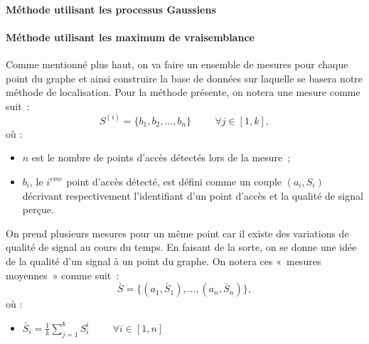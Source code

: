 \documentclass[10pt,journal,compsoc]{IEEEtran}
\begin{document}
	  \paragraph{Méthode utilisant les processus Gaussiens}

	  \paragraph{Méthode utilisant les maximum de vraisemblance}
        Comme mentionné plus haut, on va faire un ensemble de mesures pour chaque point du graphe et ainsi construire la base de données sur laquelle se basera notre
		méthode de localisation. Pour la méthode présente, on notera une mesure comme suit~:
        \begin{equation}
          S^{(i)}=\{b_{1}, b_{2}, ..., b_{n}\} \hspace{1cm} \forall j \in [1, k],  %
        \end{equation}
        où :
        \begin{itemize}
          \item $n$ est le nombre de points d'accès détectés lors de la mesure~;
          \item $b_{i}$, le $i^{eme}$ point d'accès détecté, est défini comme un couple $(a_{i}, S_{i})$ décrivant respectivement l'identifiant d'un point d'accès
		  et la qualité de signal perçue.
        \end{itemize}

        On prend plusieurs mesures pour un même point car il existe des variations de qualité de signal au cours du temps. En faisant de la sorte, on se donne une idée de
		la qualité d'un signal à un point du graphe. On notera ces «~mesures moyennes~» comme suit~:
        \begin{equation}
          \bar{S} = \{(a_{1}, \bar{S}_{1}), ..., (a_{n}, \bar{S}_{n})\},
        \end{equation}
        où :
        \begin{itemize}
          \item $\bar{S}_{i} = \frac{1}{k}\sum\limits_{j = 1}^{k} S_{i}^{i} \hspace{1cm} \forall i \in [1, n]$
        \end{itemize}
\end{document}
